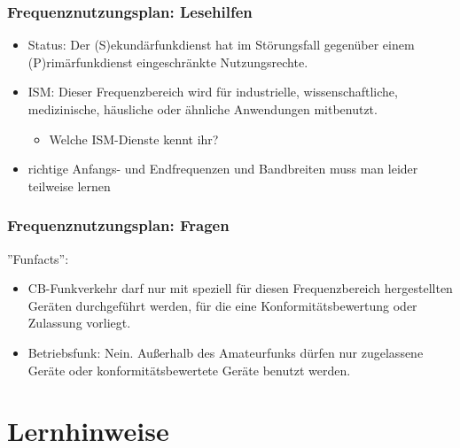 \begin{frame}
    \frametitle{Frequenznutzungsplan: Lesehilfen}

    \begin{itemize}[<+->]
        \item Status: Der (S)ekundärfunkdienst hat im Störungsfall gegenüber einem
              (P)rimärfunkdienst eingeschränkte Nutzungsrechte.
        \item ISM: Dieser Frequenzbereich wird für industrielle,
              wissenschaftliche, medizinische, häusliche oder ähnliche Anwendungen mitbenutzt.
        \begin{itemize}
            \item Welche ISM-Dienste kennt ihr?
        \end{itemize}
        \item richtige Anfangs- und Endfrequenzen und Bandbreiten muss man
              leider teilweise lernen
    \end{itemize}

\end{frame}

\begin{frame}
    \frametitle{Frequenznutzungsplan: Fragen}

    ''Funfacts'':
    
    \begin{itemize}
        \item CB-Funkverkehr darf nur mit speziell für diesen Frequenzbereich
              hergestellten Geräten durchgeführt werden, für die eine
              Konformitätsbewertung oder Zulassung vorliegt.
        \item Betriebsfunk: Nein. Außerhalb des Amateurfunks dürfen nur zugelassene Geräte oder
              konformitätsbewertete Geräte benutzt werden.
    \end{itemize}

\end{frame}

\section{Lernhinweise}

